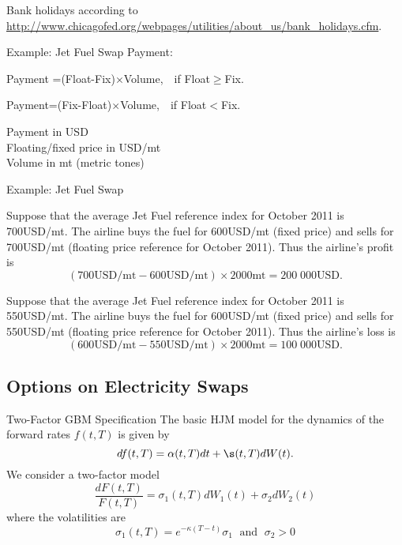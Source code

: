 	Bank holidays according to \url{http://www.chicagofed.org/webpages/utilities/about_us/bank_holidays.cfm}.





{Example: Jet Fuel Swap}
Payment:






	Payment =(Float-Fix)$\times$Volume,$\quad$if Float$\geq$Fix.


	Payment=(Fix-Float)$\times$Volume,$\quad$if Float$<$Fix.




\vspace{0.3cm}
Payment in USD\\
Floating/fixed price in USD/mt\\
Volume in mt (metric tones)

{Example: Jet Fuel Swap}






	Suppose that the average Jet Fuel reference index for October 2011 is 700USD/mt. The airline buys the fuel for 600USD/mt (fixed price) and sells for 700USD/mt (floating price reference for October 2011). Thus the airline's profit is
      $$(700\text{USD/mt} - 600\text{USD/mt})\times2000\text{mt} = 200\;000\text{USD}.$$


	Suppose that the average Jet Fuel reference index for October 2011 is 550USD/mt. The airline buys the fuel for 600USD/mt (fixed price) and sells for 550USD/mt (floating price reference for October 2011). Thus the airline's loss is
      $$(600\text{USD/mt} - 550\text{USD/mt})\times2000\text{mt} = 100\;000\text{USD}.$$





\subsection{Options on Electricity Swaps}

{Two-Factor GBM Specification}
The basic HJM model for the dynamics of the forward rates $f(t,T)$ is given by
$$
df(t,T) = \alpha(t,T) dt + \s(t,T) dW(t).
$$
We consider a two-factor model
$$
\frac{dF(t,T)}{F(t,T)}=\sigma_1(t,T)dW_1(t)+\sigma_2dW_2(t)
$$
where the volatilities are
$$
\sigma_1(t,T)=e^{-\kappa (T-t)}\sigma_1 \; \mbox{ and } \; \sigma_2>0
$$


